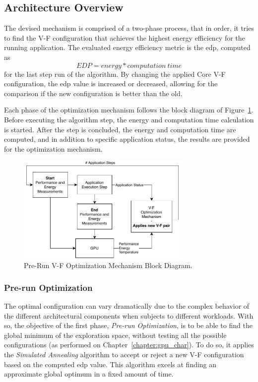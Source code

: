\subsection{Architecture Overview}

The devised mechanism is comprised of a two-phase process, that in order, it tries to find the V-F configuration that achieves the highest energy efficiency for the running application. The evaluated energy efficiency metric is the \acrshort{edp}, computed as 
\begin{equation}
	EDP=energy * computation \: time
	\label{eq:edp}
\end{equation}
for the last step run of the algorithm. By changing the applied Core V-F configuration, the \acrshort{edp} value is increased or decreased, allowing for the comparison if the new configuration is better than the old. 

Each phase of the optimization mechanism follows the block diagram of Figure~\ref{fig:detail_mech}. Before executing the algorithm step, the energy and computation time calculation is started. After the step is concluded, the energy and computation time are computed, and in addition to specific application status, the results are provided for the optimization mechanism.

\begin{figure}[htb]
  \centering
  \includegraphics[width=0.75\textwidth]{Figures/Optimization/opt_pre_run.pdf}
  \caption{Pre-Run V-F Optimization Mechanism Block Diagram.}
  \label{fig:detail_mech}
\end{figure}

\subsubsection{Pre-run Optimization}

The optimal configuration can vary dramatically due to the complex behavior of the different architectural components when subjects to different workloads. With so, the objective of the first phase, \textit{Pre-run Optimization}, is to be able to find the global minimum of the exploration space, without testing all the possible configurations (as performed on Chapter~\ref{chapter:gpu_char}). To do so, it applies the \textit{Simulated Annealing} algorithm to accept or reject a new V-F configuration based on the computed \acrshort{edp} value. This algorithm excels at finding an approximate global optimum in a fixed amount of time. 

